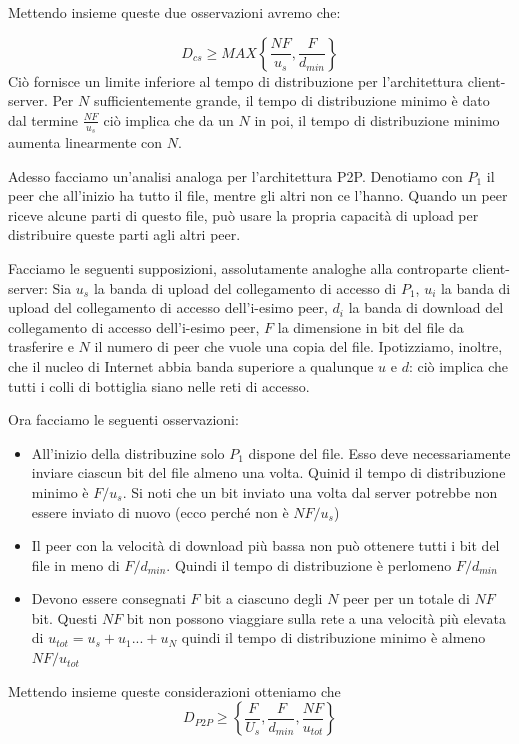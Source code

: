 \documentclass{book}
\begin{document}
Mettendo insieme queste due osservazioni avremo che:

$$ D_{cs} \geq MAX\left\{ \frac{NF}{u_{s}}, \frac{F}{d_{min}} \right \} $$
Ciò fornisce un limite inferiore al tempo di distribuzione per l'architettura client-server. Per $N$ sufficientemente grande, il tempo di distribuzione minimo è dato dal termine $\frac{NF}{u_{s}}$ ciò implica che da un $N$ in poi, il tempo di distribuzione minimo aumenta linearmente con $N$.

Adesso facciamo un'analisi analoga per l'architettura P2P. Denotiamo con $P_{1}$ il peer che all'inizio ha tutto il file, mentre gli altri non ce l'hanno. Quando un peer riceve alcune parti di questo file, può usare la propria capacità di upload per distribuire queste parti agli altri peer.

Facciamo le seguenti supposizioni, assolutamente analoghe alla controparte client-server:
Sia $u_{s}$ la banda di upload del collegamento di accesso di $P_{1}$, $u_{i}$ la banda di upload del collegamento di accesso dell'i-esimo peer, $d_{i}$ la banda di download del collegamento di accesso dell'i-esimo peer, $F$ la dimensione in bit del file da trasferire e $N$ il numero di peer che vuole una copia del file. Ipotizziamo, inoltre, che il nucleo di Internet abbia banda superiore a qualunque $u$ e $d$: ciò implica che tutti i colli di bottiglia siano nelle reti di accesso.

Ora facciamo le seguenti osservazioni:
\begin{itemize}
	\item All'inizio della distribuzine solo $P_{1}$ dispone del file. Esso deve necessariamente inviare ciascun bit del file almeno una volta. Quinid il tempo di distribuzione minimo è $F/u_{s}$. Si noti che un bit inviato una volta dal server potrebbe non essere inviato di nuovo (ecco perché non è $NF/u_{s}$)
	\item Il peer con la velocità di download più bassa non può ottenere tutti i bit del file in meno di $F/d_{min}$. Quindi il tempo di distribuzione è perlomeno $F/d_{min}$
	\item Devono essere consegnati $F$ bit a ciascuno degli $N$ peer per un totale di $NF$ bit. Questi $NF$ bit non possono viaggiare sulla rete a una velocità più elevata di $u_{tot} = u_{s} + u_1 ... + u_{N}$ quindi il tempo di distribuzione minimo è almeno $NF/u_{tot}$
\end{itemize}

Mettendo insieme queste considerazioni otteniamo che
$$  D_{P2P} \geq \left\{ \frac{F}{U_s}, \frac{F}{d_{min}}, \frac{NF}{u_{tot}} \right\}$$
\end{document}
